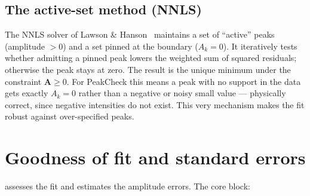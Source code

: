 \documentclass[11pt,a4paper]{article}
\begin{document}
\subsection{The active-set method (NNLS)}
The NNLS solver of Lawson \& Hanson~\citep{LawsonHanson1995} maintains a set of
``active'' peaks (amplitude $>0$) and a set pinned at the boundary ($A_k = 0$). It
iteratively tests whether admitting a pinned peak lowers the weighted sum of
squared residuals; otherwise the peak stays at zero. The result is the unique
minimum under the constraint $\mathbf{A}\ge 0$. For PeakCheck this means a peak
with no support in the data gets exactly $A_k = 0$ rather than a negative or noisy
small value --- physically correct, since negative intensities do not exist. This
very mechanism makes the fit robust against over-specified peaks.

\section{Goodness of fit and standard errors}
 assesses the fit and estimates the amplitude errors. The
core block:
\end{document}
